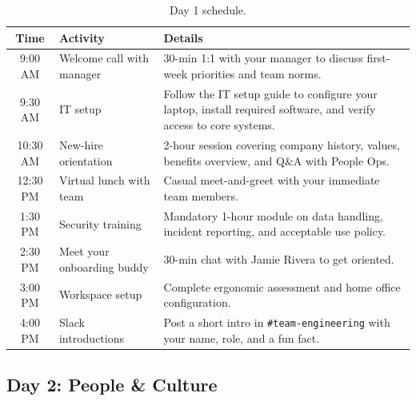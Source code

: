 \documentclass[
    language=english,
    doctype=onboarding-guide,
    institution=none,
]{../../omnilatex}
\begin{document}
\begin{table}[h]
    \centering
    \begin{tabular}{clp{7cm}}
        \toprule
        \textbf{Time} & \textbf{Activity} & \textbf{Details} \\
        \midrule
        9:00 AM  & Welcome call with manager & 30-min 1:1 with your manager to
            discuss first-week priorities and team norms. \\
        9:30 AM  & IT setup & Follow the IT setup guide to configure your
            laptop, install required software, and verify access to core
            systems. \\
        10:30 AM & New-hire orientation & 2-hour session covering company
            history, values, benefits overview, and Q\&A with People Ops. \\
        12:30 PM & Virtual lunch with team & Casual meet-and-greet with your
            immediate team members. \\
        1:30 PM  & Security training & Mandatory 1-hour module on data
            handling, incident reporting, and acceptable use policy. \\
        2:30 PM  & Meet your onboarding buddy & 30-min chat with Jamie Rivera
            to get oriented. \\
        3:00 PM  & Workspace setup & Complete ergonomic assessment and home
            office configuration. \\
        4:00 PM  & Slack introductions & Post a short intro in \texttt{\#team-engineering}
            with your name, role, and a fun fact. \\
        \bottomrule
    \end{tabular}
    \caption{Day 1 schedule.}
\end{table}

\subsection{Day 2: People \& Culture}
\end{document}
